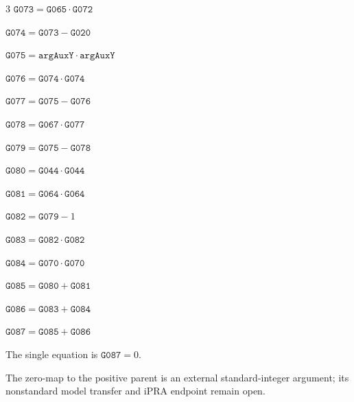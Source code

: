\documentclass[10pt]{article}
\begin{document}
\begin{multicols}{3}
\noindent $\mathtt{G073}=\mathtt{G065}\cdot \mathtt{G072}$\par
\noindent $\mathtt{G074}=\mathtt{G073}-\mathtt{G020}$\par
\noindent $\mathtt{G075}=\mathtt{argAuxY}\cdot \mathtt{argAuxY}$\par
\noindent $\mathtt{G076}=\mathtt{G074}\cdot \mathtt{G074}$\par
\noindent $\mathtt{G077}=\mathtt{G075}-\mathtt{G076}$\par
\noindent $\mathtt{G078}=\mathtt{G067}\cdot \mathtt{G077}$\par
\noindent $\mathtt{G079}=\mathtt{G075}-\mathtt{G078}$\par
\noindent $\mathtt{G080}=\mathtt{G044}\cdot \mathtt{G044}$\par
\noindent $\mathtt{G081}=\mathtt{G064}\cdot \mathtt{G064}$\par
\noindent $\mathtt{G082}=\mathtt{G079}-1$\par
\noindent $\mathtt{G083}=\mathtt{G082}\cdot \mathtt{G082}$\par
\noindent $\mathtt{G084}=\mathtt{G070}\cdot \mathtt{G070}$\par
\noindent $\mathtt{G085}=\mathtt{G080}+\mathtt{G081}$\par
\noindent $\mathtt{G086}=\mathtt{G083}+\mathtt{G084}$\par
\noindent $\mathtt{G087}=\mathtt{G085}+\mathtt{G086}$\par
\end{multicols}
The single equation is $\boxed{\mathtt{G087}=0}$.
\par\small The zero-map to the positive parent is an external standard-integer argument; its nonstandard model transfer and iPRA endpoint remain open.
\end{document}
